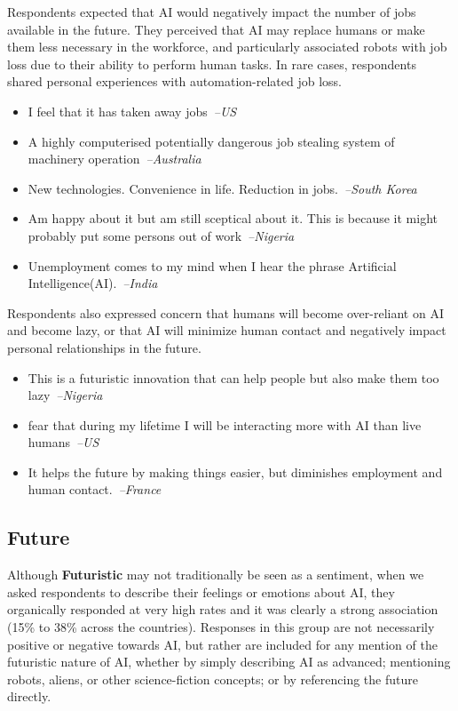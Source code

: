 \documentclass[11pt]{article} %
\newcommand\aff[1]{\textcolor{darkplum}{{\emph{--#1}}}}
\newenvironment{lq2}
{ \vspace{-3pt}
  \begin{itemize}[leftmargin = 4.0em, rightmargin=5.0em, label={}]
    \fontsize{10pt}{10.7pt}\selectfont
    \setlength{\itemsep}{3pt}
    \setlength{\parskip}{2.5pt}
    \setlength{\parsep}{3pt}     }
{ \end{itemize} \vspace{1pt}  }
\def\Futuristic/{{\fontfamily{lmss}\selectfont\textbf{Futuristic}}}
\begin{document}
Respondents expected that AI would negatively impact the number of jobs available in the future. They perceived that AI may replace humans or make them less necessary in the workforce, and particularly  associated robots with job loss due to their ability to perform human tasks. In rare cases, respondents shared personal experiences with automation-related job loss.
\begin{lq2}
\item I feel that it has taken away jobs~\aff{US}
\item A highly computerised potentially dangerous job stealing system of machinery operation~\aff{Australia}
\item New technologies. Convenience in life. Reduction in jobs.~\aff{South Korea}
\item Am happy about it but am still sceptical about it. This is because it might probably put some persons out of work~\aff{Nigeria}
\item Unemployment comes to my mind when I hear the phrase Artificial Intelligence(AI).~\aff{India}
\end{lq2}

Respondents also expressed concern that humans will become over-reliant on AI and become lazy, or that AI will minimize human contact and negatively impact personal relationships in the future.

\begin{lq2}
\item This is a futuristic innovation that can help people but also make them too lazy~\aff{Nigeria}
\item fear that during my lifetime I will be interacting more with AI than live humans~\aff{US}
\item It helps the future by making things easier, but diminishes employment and human contact.~\aff{France}
\end{lq2}

\subsection{Future}
Although \Futuristic/ may not traditionally be seen as a sentiment, when we asked respondents to describe their feelings or emotions about AI, they organically responded at very high rates and it was clearly a strong association
(15\% to 38\% across the countries).
Responses in this group are not necessarily positive or negative towards AI,
but rather are included for any mention of the futuristic nature of AI, whether by simply describing AI as advanced; mentioning robots, aliens, or other science-fiction concepts; or by referencing the future directly.
\end{document}
